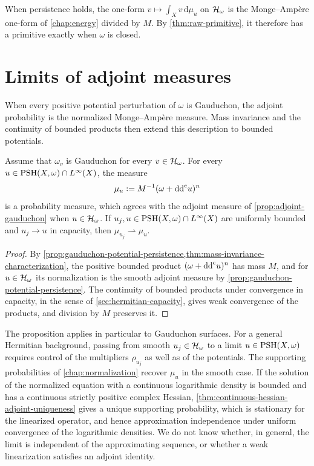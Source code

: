 When persistence holds, the one-form $v\mapsto\int_Xv\,\mathrm d\mu_u$ on $\mathcal H_\omega$ is the Monge--Amp\`ere one-form of \cref{chap:energy} divided by $M$. By \cref{thm:raw-primitive}, it therefore has a primitive exactly when $\omega$ is closed.




\section{Limits of adjoint measures}
\label{sec:adjoint-measure-limits}

When every positive potential perturbation of $\omega$ is Gauduchon, the adjoint probability is the normalized Monge--Amp\`ere measure. Mass invariance and the continuity of bounded products then extend this description to bounded potentials.

\begin{proposition}\label{prop:bounded-adjoint-persistence}
Assume that $\omega_v$ is Gauduchon for every $v\in\mathcal H_\omega$. For every $u\in\mathrm{PSH}(X,\omega)\cap L^\infty(X)$, the measure
\[
 \mu_u:=M^{-1}(\omega+\mathrm{dd}^{\mathrm{c}} u)^n
\]
is a probability measure, which agrees with the adjoint measure of \cref{prop:adjoint-gauduchon} when $u\in\mathcal H_\omega$. If $u_j,u\in\mathrm{PSH}(X,\omega)\cap L^\infty(X)$ are uniformly bounded and $u_j\to u$ in capacity, then $\mu_{u_j}\rightharpoonup\mu_u$.
\end{proposition}
\begin{proof}
By \cref{prop:gauduchon-potential-persistence,thm:mass-invariance-characterization}, the positive bounded product $(\omega+\mathrm{dd}^{\mathrm{c}} u)^n$ has mass $M$, and for $u\in\mathcal H_\omega$ its normalization is the smooth adjoint measure by \cref{prop:gauduchon-potential-persistence}. The continuity of bounded products under convergence in capacity, in the sense of \cref{sec:hermitian-capacity}, gives weak convergence of the products, and division by $M$ preserves it.
\end{proof}

The proposition applies in particular to Gauduchon surfaces. For a general Hermitian background, passing from smooth $u_j\in\mathcal H_\omega$ to a limit $u\in\mathrm{PSH}(X,\omega)$ requires control of the multipliers $\rho_{u_j}$ as well as of the potentials. The supporting probabilities of \cref{chap:normalization} recover $\mu_u$ in the smooth case. If the solution of the normalized equation with a continuous logarithmic density is bounded and has a continuous strictly positive complex Hessian, \cref{thm:continuous-hessian-adjoint-uniqueness} gives a unique supporting probability, which is stationary for the linearized operator, and hence approximation independence under uniform convergence of the logarithmic densities. We do not know whether, in general, the limit is independent of the approximating sequence, or whether a weak linearization satisfies an adjoint identity.

